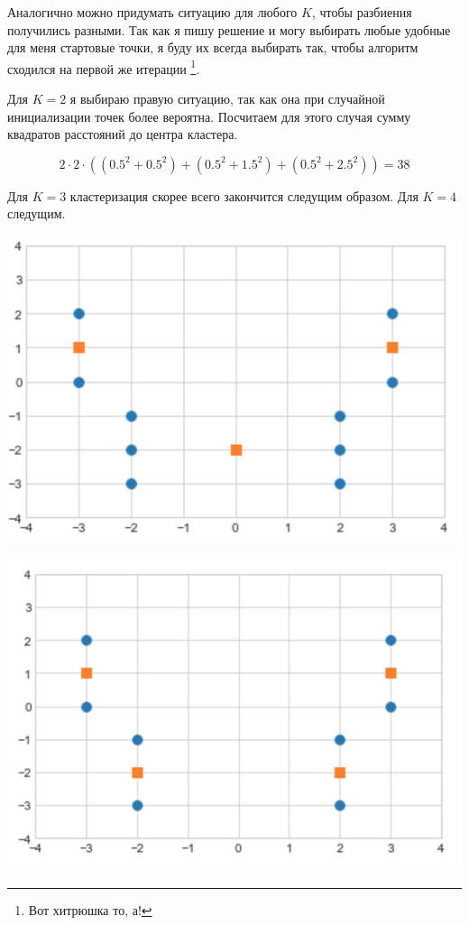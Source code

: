 \documentclass[12pt, a4paper, oneside]{article}
\begin{document}
{Аналогично можно придумать ситуацию для любого $K$, чтобы разбиения получились разными.  Так как я пишу решение и могу выбирать любые удобные для меня стартовые точки, я буду их всегда выбирать так, чтобы алгоритм сходился на первой же итерации \footnote{Вот хитрюшка то, а!}.  

Для $K=2$ я выбираю правую ситуацию, так как она при случайной инициализации точек более вероятна. Посчитаем для этого случая сумму квадратов расстояний до центра кластера. 

\[ 2\cdot 2 \cdot((0.5^2 + 0.5^2) + (0.5^2 + 1.5^2) + (0.5^2 + 2.5^2)) = 38\]


Для $K=3$ кластеризация скорее всего закончится следущим образом.  Для $K=4$ следущим. 

\begin{minipage}[t]{0.45\textwidth}
	\includegraphics[scale=0.25]{k_means_c3.png}
\end{minipage}
\hfill
\begin{minipage}[t]{0.45\textwidth}
	\includegraphics[scale=0.25]{k_means_c4.png}
\end{minipage}

}
\end{document}
